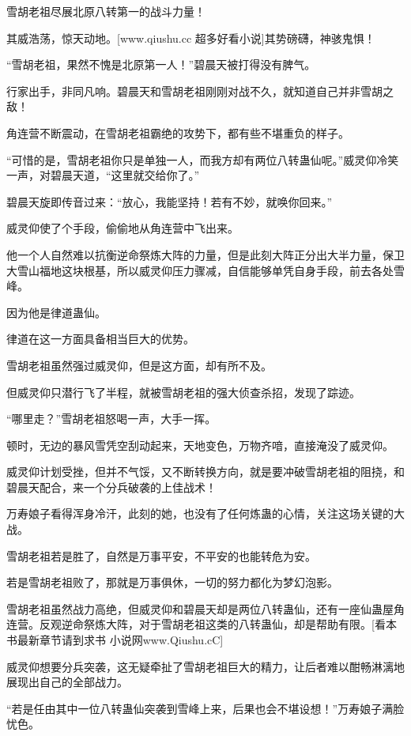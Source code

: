 
\begin{this_body}

雪胡老祖尽展北原八转第一的战斗力量！

其威浩荡，惊天动地。[www.qiushu.cc 超多好看小说]其势磅礴，神骇鬼惧！

“雪胡老祖，果然不愧是北原第一人！”碧晨天被打得没有脾气。

行家出手，非同凡响。碧晨天和雪胡老祖刚刚对战不久，就知道自己并非雪胡之敌！

角连营不断震动，在雪胡老祖霸绝的攻势下，都有些不堪重负的样子。

“可惜的是，雪胡老祖你只是单独一人，而我方却有两位八转蛊仙呢。”威灵仰冷笑一声，对碧晨天道，“这里就交给你了。”

碧晨天旋即传音过来：“放心，我能坚持！若有不妙，就唤你回来。”

威灵仰使了个手段，偷偷地从角连营中飞出来。

他一个人自然难以抗衡逆命祭炼大阵的力量，但是此刻大阵正分出大半力量，保卫大雪山福地这块根基，所以威灵仰压力骤减，自信能够单凭自身手段，前去各处雪峰。

因为他是律道蛊仙。

律道在这一方面具备相当巨大的优势。

雪胡老祖虽然强过威灵仰，但是这方面，却有所不及。

但威灵仰只潜行飞了半程，就被雪胡老祖的强大侦查杀招，发现了踪迹。

“哪里走？”雪胡老祖怒喝一声，大手一挥。

顿时，无边的暴风雪凭空刮动起来，天地变色，万物齐喑，直接淹没了威灵仰。

威灵仰计划受挫，但并不气馁，又不断转换方向，就是要冲破雪胡老祖的阻挠，和碧晨天配合，来一个分兵破袭的上佳战术！

万寿娘子看得浑身冷汗，此刻的她，也没有了任何炼蛊的心情，关注这场关键的大战。

雪胡老祖若是胜了，自然是万事平安，不平安的也能转危为安。

若是雪胡老祖败了，那就是万事俱休，一切的努力都化为梦幻泡影。

雪胡老祖虽然战力高绝，但威灵仰和碧晨天却是两位八转蛊仙，还有一座仙蛊屋角连营。反观逆命祭炼大阵，对于雪胡老祖这类的八转蛊仙，却是帮助有限。[看本书最新章节请到求书 小说网www.Qiushu.cC]

威灵仰想要分兵突袭，这无疑牵扯了雪胡老祖巨大的精力，让后者难以酣畅淋漓地展现出自己的全部战力。

“若是任由其中一位八转蛊仙突袭到雪峰上来，后果也会不堪设想！”万寿娘子满脸忧色。


\end{this_body}
